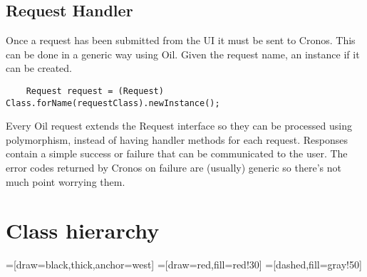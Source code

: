 \documentclass[a4paper,12pt, titlepage]{article}
\begin{document}
	\subsection{Request Handler}
	Once a request has been submitted from the UI it must be sent to Cronos. This can be done in a generic way using Oil. Given the request name, an instance if it can be created.
	\begin{verbatim}
	Request request = (Request) Class.forName(requestClass).newInstance();
	\end{verbatim}
	Every Oil request extends the Request interface so they can be processed using polymorphism, instead of having handler methods for each request. Responses contain a simple success or failure that can be communicated to the user. The error codes returned by Cronos on failure are (usually) generic so there's not much point worrying them.

\section{Class hierarchy}

=[draw=black,thick,anchor=west]
=[draw=red,fill=red!30]
=[dashed,fill=gray!50]
\end{document}
